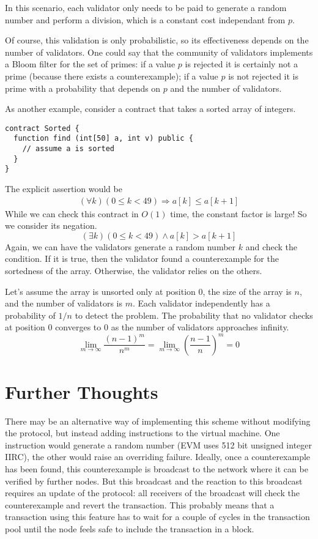\documentclass{article}
\begin{document}
In this scenario, each validator only needs to be paid to generate a random number and
perform a division, which is a constant cost independant from $p$.

Of course, this validation is only probabilistic, so its effectiveness depends on the
number of validators. One could say that the community of validators implements a Bloom
filter for the set of primes: if a value $p$ is rejected it is certainly not a prime (because
there exists a counterexample); if a value $p$ is not rejected it is prime with a
probability that depends on $p$ and the number of validators. 

As another example, consider a contract that takes a sorted array of integers.
\begin{lstlisting}[numbers=none]
contract Sorted {
  function find (int[50] a, int v) public {
    // assume a is sorted
  }
}
\end{lstlisting}
The explicit assertion would be
\begin{gather}\label{eq:1}
  (\forall k) (0\le k <49) \Rightarrow a[k] \le a[k+1]
\end{gather}
While we can check this contract in $O(1)$ time, the constant factor is large! So we
consider its negation.
\begin{displaymath}
  (\exists k) (0\le k <49) \wedge a[k] > a[k+1]
\end{displaymath}
Again, we can have the validators generate a random number $k$ and check the
condition. If it is true, then the validator found a counterexample for the sortedness
of the array. Otherwise, the validator relies on the others.

Let's assume the array is unsorted only at position $0$, the size of the array is $n$,
and the number of validators is $m$. Each validator independently has a probability of
$1/n$ to detect the problem. The probability that no validator checks at
position $0$ converges to $0$ as the number of validators approaches infinity.
\begin{displaymath}
  \lim_{m\to\infty}\frac{(n-1)^m}{n^m}
  = \lim_{m\to\infty} \left(\frac{n-1}{n}\right)^m
  = 0
\end{displaymath}

\section{Further Thoughts}
\label{sec:further-thoughts}

There may be an alternative way of implementing this scheme without modifying the
protocol, but instead adding instructions to the virtual machine. One instruction would
generate a random number (EVM uses 512 bit unsigned integer IIRC), the other would
raise an overriding failure. Ideally, once a counterexample has been found, this
counterexample is broadcast to the network where it can be verified by further nodes.
But this broadcast and the reaction to this broadcast requires an update of the
protocol: all receivers of the broadcast will check the counterexample and revert the
transaction. This probably means that a transaction using this feature has to wait for
a couple of cycles in the transaction pool until the node feels safe to include the
transaction in a block.
\end{document}

